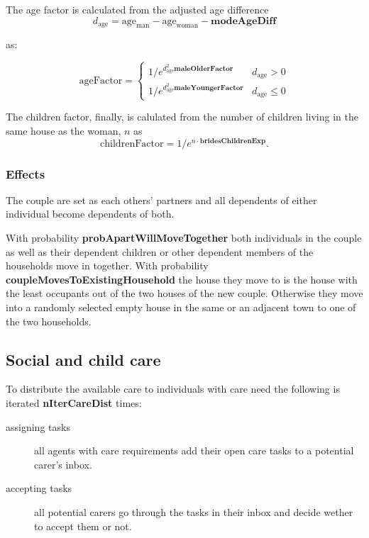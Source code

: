 \documentclass{article}
\newcommand{\marginnote}[1]{\protect\marginpar{\small\texttt{#1}}}
\begin{document}
The age factor is calculated from the adjusted age difference 
\[
d_\mathrm{age} = \mathrm{age}_\mathrm{man} - \mathrm{age}_\mathrm{woman} - \mathbf{modeAgeDiff}
\]

as:

\[
\mathrm{ageFactor} = \left\{
    \begin{array}{ll}
    1/e^{d_\mathrm{age}^2\mathbf{maleOlderFactor}} & d_\mathrm{age} > 0 \\
    1/e^{d_\mathrm{age}^2\mathbf{maleYoungerFactor}} & d_\mathrm{age} \leq 0 
    \end{array}
    \right.
\]

The children factor, finally, is calulated from the number of children living in the same house as the woman, $n$ as 
\[
\mathrm{childrenFactor} = 1/e^{n \cdot \mathbf{bridesChildrenExp}}.
\]


\subsubsection*{Effects}

The couple are set as each others' partners and all dependents of either individual become dependents of both.

With probability \textbf{probApartWillMoveTogether} both individuals in the couple as well as their dependent children or other dependent members of the households move in together. With probability \textbf{coupleMovesToExistingHousehold} the house they move to is the house with the least occupants out of the two houses of the new couple.  Otherwise they move into a randomly selected empty house in the same or an adjacent town to one of the two households.


\subsection{Social and child care \marginnote{TasksCare.jl}}

To distribute the available care to individuals with care need the following is iterated \textbf{nIterCareDist} times:

\begin{description}

\item[assigning tasks] all agents with care requirements add their open care tasks to a potential carer's inbox.

\item[accepting tasks] all potential carers go through the tasks in their inbox and decide wether to accept them or not.

\end{description}
\end{document}
